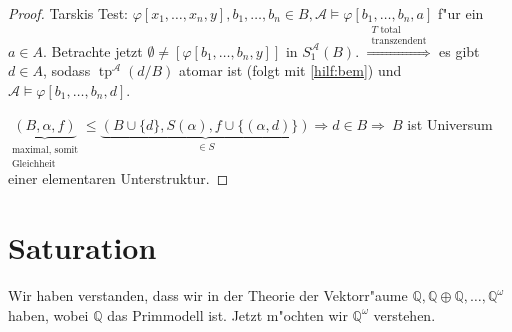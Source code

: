 \documentclass[a4paper,12pt,numbers=noenddot,parskip=full]{scrartcl}
\newcommand{\setQ}{\mathbb{Q}}
\newcommand{\scrA}{\mathcal{A}}
\DeclareMathOperator{\typ}{tp}
\theoremstyle{dotless}
\begin{document}
\begin{proof}
	Tarskis Test: $\varphi[x_1, \dots, x_n, y], b_1, \dots, b_n \in B, \scrA \models \varphi[b_1, \dots, b_n, a]$ f"ur ein $a \in A$. Betrachte jetzt $\emptyset \neq [\varphi[b_1, \dots, b_n, y]]$ in $S_1^\scrA(B)$. $\overset{\substack{T\text{ total}\\\text{transzendent}}}{\Longrightarrow}$ es gibt $d \in A$, sodass $\typ^\scrA(d/B)$ atomar ist (folgt mit \eqref{hilf:bem}) und $\scrA \models \varphi[b_1, \dots, b_n, d]$.
	
	$\underbrace{(B, \alpha, f)}_{\substack{\text{maximal, somit}\\\text{Gleichheit}}} \leq \underbrace{(B \cup \{d\}, S(\alpha), f \cup \{(\alpha, d)\})}_{\in S} \Longrightarrow d \in B \Longrightarrow~ B$ ist Universum einer elementaren Unterstruktur.
\end{proof}

\newpage
\section{Saturation}
Wir haben verstanden, dass wir in der Theorie der Vektorr"aume $\setQ, \setQ \oplus \setQ, \dots , \setQ^\omega$ haben, wobei $\setQ$ das Primmodell ist. Jetzt m"ochten wir $\setQ^\omega$ verstehen.
\end{document}
